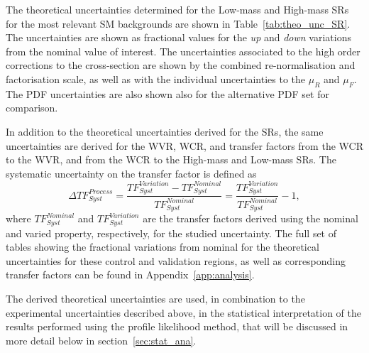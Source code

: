 \begin{description}
	\begin{table}[!hbt]
	\centering
	\caption{Fractional variations from nominal of theoretical uncertainties in Low-mass \ac{SR} and High-mass \ac{SR}.
	}
	\resizebox{\textwidth}{!}{
		}
	\resizebox{\textwidth}{!}{
		}
	\label{tab:theo_unc_SR}
	\end{table}
	The theoretical uncertainties determined for the Low-mass and High-mass \acp{SR} for the most relevant \ac{SM} backgrounds are shown in Table~\ref{tab:theo_unc_SR}.
	The uncertainties are shown as fractional values for the \textit{up} and \textit{down} variations from the nominal value of interest.
	The uncertainties associated to the high order corrections to the cross-section are shown by the combined re-normalisation and factorisation scale, as well as with the individual uncertainties to the $\mu_R$ and $\mu_F$. The \ac{PDF} uncertainties are also shown also for the alternative \ac{PDF} set for comparison.
	
	In addition to the theoretical uncertainties derived for the \acp{SR}, the same uncertainties are derived for the WVR, WCR, and transfer factors from the WCR to the WVR, and from the WCR to the High-mass and Low-mass \acp{SR}. The systematic uncertainty on the transfer factor is defined as 
	\begin{equation}
	\Delta TF_{Syst}^{Process} = \frac{TF_{Syst}^{Variation}-TF_{Syst}^{Nominal}}{TF_{Syst}^{Nominal}} = \frac{TF_{Syst}^{Variation}}{TF_{Syst}^{Nominal}}-1,
	\label{eq:TF}
	\end{equation}
	where $TF_{Syst}^{Nominal}$ and $TF_{Syst}^{Variation}$ are the transfer factors derived using the nominal and varied property, respectively, for the studied uncertainty. 
	The full set of tables showing the fractional variations from nominal for the theoretical uncertainties for these control and validation regions, as well as corresponding transfer factors can be found in Appendix~\ref{app:analysis}.
	
	The derived theoretical uncertainties are used, in combination to the experimental uncertainties described above, in the statistical interpretation of the results performed using the profile likelihood method, that will be discussed in more detail below in section~\ref{sec:stat_ana}.
	\end{description}
